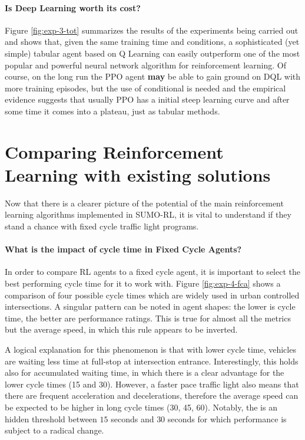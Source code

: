 
\paragraph{Is Deep Learning worth its cost?}

Figure \ref{fig:exp-3-tot} summarizes the results of the experiments being carried out and shows that, given the same training time and conditions, a sophisticated (yet simple) tabular agent based on Q Learning can easily outperform one of the most popular and powerful neural network algorithm for reinforcement learning.
Of course, on the long run the PPO agent \textbf{may} be able to gain ground on DQL with more training episodes, but the use of conditional is needed and the empirical evidence \cite{kozlica2023deep} suggests that usually PPO has a initial steep learning curve and after some time it comes into a plateau, just as tabular methods.


\section{Comparing Reinforcement Learning with existing solutions}

Now that there is a clearer picture of the potential of the main reinforcement learning algorithms implemented in SUMO-RL, it is vital to understand if they stand a chance with fixed cycle traffic light programs.

\paragraph{What is the impact of cycle time in Fixed Cycle Agents?}

In order to compare RL agents to a fixed cycle agent, it is important to select the best performing cycle time for it to work with. Figure \ref{fig:exp-4-fca} shows a comparison of four possible cycle times which are widely used in urban controlled intersections.
A singular pattern can be noted in agent shapes: the lower is cycle time, the better are performance ratings.
This is true for almost all the metrics but the average speed, in which this rule appears to be inverted.

A logical explanation for this phenomenon is that with lower cycle time, vehicles are waiting less time at full-stop at intersection entrance.
Interestingly, this holds also for accumulated waiting time, in which there is a clear advantage for the lower cycle times (15 and 30).
However, a faster pace traffic light also means that there are frequent acceleration and decelerations, therefore the average speed can be expected to be higher in long cycle times (30, 45, 60).
Notably, the is an hidden threshold between $15$ seconds and $30$ seconds for which performance is subject to a radical change.

